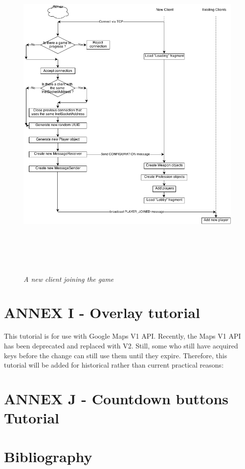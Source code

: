 \documentclass{article}
\begin{document}
\begin{figure}
\includegraphics[height=6.72in,width=7.12in]{./images/diagrams/Client-Server.png}
\caption{\small \sl A new client joining the game
\label{fig:client_server_flow}}
\end{figure}

\section{ANNEX I - Overlay tutorial}

This tutorial is for use with Google Maps V1 API. Recently, the Maps V1 API has
been deprecated and replaced with V2. Still, some who still have acquired keys
before the change can still use them until they expire. Therefore, this tutorial
will be added for historical rather than current practical reasons: \newline





\section{ANNEX J - Countdown buttons Tutorial}





\section{Bibliography}
		
	
\end{document}
